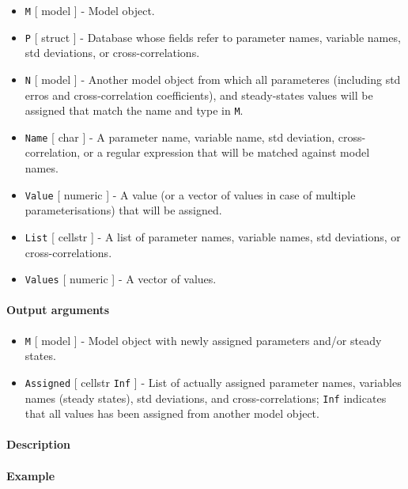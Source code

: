 \begin{itemize}
\item
  \texttt{M} {[} model {]} - Model object.
\item
  \texttt{P} {[} struct {]} - Database whose fields refer to parameter
  names, variable names, std deviations, or cross-correlations.
\item
  \texttt{N} {[} model {]} - Another model object from which all
  parameteres (including std erros and cross-correlation coefficients),
  and steady-states values will be assigned that match the name and type
  in \texttt{M}.
\item
  \texttt{Name} {[} char {]} - A parameter name, variable name, std
  deviation, cross-correlation, or a regular expression that will be
  matched against model names.
\item
  \texttt{Value} {[} numeric {]} - A value (or a vector of values in
  case of multiple parameterisations) that will be assigned.
\item
  \texttt{List} {[} cellstr {]} - A list of parameter names, variable
  names, std deviations, or cross-correlations.
\item
  \texttt{Values} {[} numeric {]} - A vector of values.
\end{itemize}

\paragraph{Output arguments}

\begin{itemize}
\item
  \texttt{M} {[} model {]} - Model object with newly assigned parameters
  and/or steady states.
\item
  \texttt{Assigned} {[} cellstr \textbar{} \texttt{Inf} {]} - List of
  actually assigned parameter names, variables names (steady states),
  std deviations, and cross-correlations; \texttt{Inf} indicates that
  all values has been assigned from another model object.
\end{itemize}

\paragraph{Description}

\paragraph{Example}


